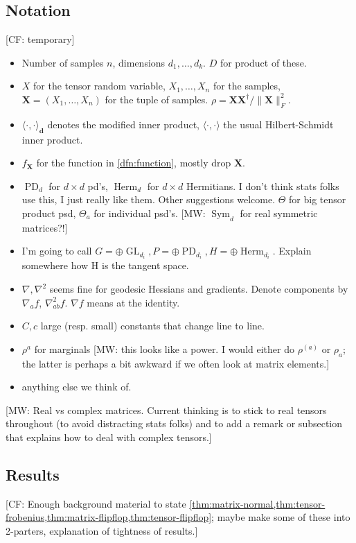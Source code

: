\documentclass{article}
\renewcommand{\vec}{\bm}
\newcommand\PD{\operatorname{PD}}
\newcommand\Herm{\operatorname{Herm}}
\newcommand\GL{\operatorname{GL}}
\newcommand{\CF}[1]{{\color{purple}[CF: #1]}}
\newcommand{\MW}[1]{{\color{red}[MW: #1]}}
\begin{document}
\subsection{Notation}
\CF{temporary}
\begin{itemize}
\item Number of samples $n$, dimensions $d_1, \dots, d_k$. $D$ for product of these. 
\item $X$ for the tensor random variable, $X_1, \dots, X_n$ for the samples, $\vec X = (X_1, \dots, X_n)$ for the tuple of samples. $\rho = \vec X \vec X^\dagger/\|\vec X\|_F^2$.
\item $\langle \cdot, \cdot \rangle_{\vec d}$ denotes the modified inner product, $\langle \cdot, \cdot \rangle$ the usual Hilbert-Schmidt inner product. 
\item $f_{\vec X}$ for the function in \cref{dfn:function}, mostly drop $\vec X$.
\item $\PD_d$ for $d \times d$ pd's, $\Herm_d$ for $d \times d$ Hermitians. I don't think stats folks use this, I just really like them. Other suggestions welcome. $\Theta$ for big tensor product psd, $\Theta_a$ for individual psd's. \MW{$\operatorname{Sym}_d$ for real symmetric matrices?!}
\item I'm going to call $G = \oplus \GL_{d_i}, P = \oplus \PD_{d_i}, H = \oplus \Herm_{d_i}$. Explain somewhere how H is the tangent space.
\item $\nabla, \nabla^2$ seems fine for geodesic Hessians and gradients. Denote components by $\nabla_a f$, $\nabla^2_{ab} f$. $\nabla f$ means at the identity.
\item $C, c$ large (resp. small) constants that change line to line. 
\item $\rho^a$ for marginals \MW{this looks like a power. I would either do $\rho^{(a)}$ or $\rho_a$; the latter is perhaps a bit awkward if we often look at matrix elements.}
\item anything else we think of.
\end{itemize}

\MW{Real vs complex matrices. Current thinking is to stick to real tensors throughout (to avoid distracting stats folks) and to add a remark or subsection that explains how to deal with complex tensors.}

\subsection{Results}

\CF{Enough background material to state \cref{thm:matrix-normal,thm:tensor-frobenius,thm:matrix-flipflop,thm:tensor-flipflop}; maybe make some of these into 2-parters, explanation of tightness of results.}
\end{document}
